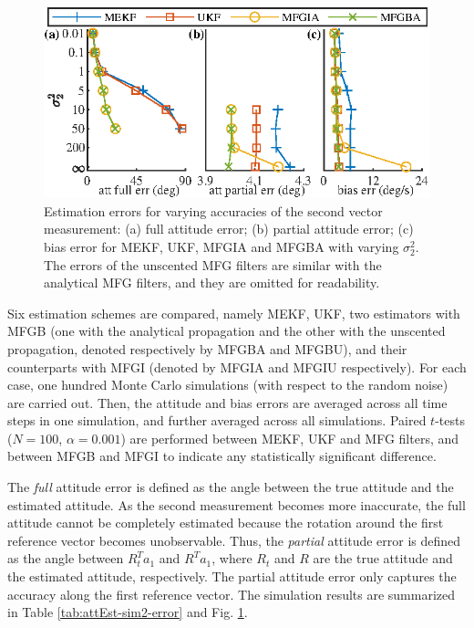 \begin{figure}
	\centering
	\includegraphics[scale=1.4]{figures/attEst-sim2-error}
	\caption[Estimation errors for varying accuracies of the second vector measurement.]{Estimation errors for varying accuracies of the second vector measurement: (a) full attitude error; (b) partial attitude error; (c) bias error for MEKF, UKF, MFGIA and MFGBA with varying $\sigma_2^2$.
		The errors of the unscented MFG filters are similar with the analytical MFG filters, and they are omitted for readability. \label{fig:attEst-sim2-error}}
\end{figure}

Six estimation schemes are compared, namely MEKF, UKF, two estimators with MFGB (one with the analytical propagation and the other with the unscented propagation, denoted respectively by MFGBA and MFGBU), and their counterparts with MFGI (denoted by MFGIA and MFGIU respectively).
For each case, one hundred Monte Carlo simulations (with respect to the random noise) are carried out.
Then, the attitude and bias errors are averaged across all time steps in one simulation, and further averaged across all simulations.
Paired $t$-tests ($N=100$, $\alpha=0.001$) are performed between MEKF, UKF and MFG filters, and between MFGB and MFGI to indicate any statistically significant difference.

The \textit{full} attitude error is defined as the angle between the true attitude and the estimated attitude.
As the second measurement becomes more inaccurate, the full attitude cannot be completely estimated because the rotation around the first reference vector becomes unobservable.
Thus, the \textit{partial} attitude error is defined as the angle between $R^T_t a_1$ and $R^Ta_1$, where $R_t$ and $R$ are the true attitude and the estimated attitude, respectively.
The partial attitude error only captures the accuracy along the first reference vector.
The simulation results are summarized in Table \ref{tab:attEst-sim2-error} and Fig. \ref{fig:attEst-sim2-error}.

